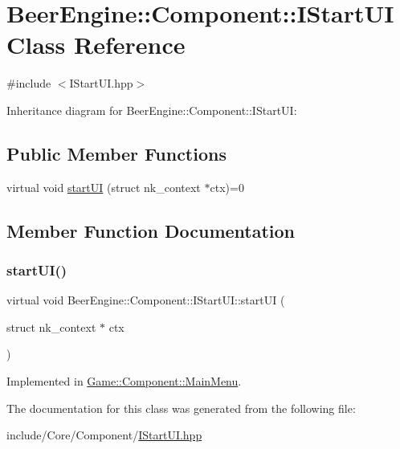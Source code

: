 \hypertarget{class_beer_engine_1_1_component_1_1_i_start_u_i}{}\section{Beer\+Engine\+:\+:Component\+:\+:I\+Start\+UI Class Reference}
\label{class_beer_engine_1_1_component_1_1_i_start_u_i}


{\ttfamily \#include $<$I\+Start\+U\+I.\+hpp$>$}



Inheritance diagram for Beer\+Engine\+:\+:Component\+:\+:I\+Start\+UI\+:
\subsection*{Public Member Functions}
\begin{DoxyCompactItemize}
\item 
virtual void \mbox{\hyperlink{class_beer_engine_1_1_component_1_1_i_start_u_i_a95b739f21079f5f103da42ea34f826f2}{start\+UI}} (struct nk\+\_\+context $\ast$ctx)=0
\end{DoxyCompactItemize}


\subsection{Member Function Documentation}
\mbox{\label{class_beer_engine_1_1_component_1_1_i_start_u_i_a95b739f21079f5f103da42ea34f826f2}} 
\subsubsection{\texorpdfstring{start\+U\+I()}{startUI()}}
{\footnotesize\ttfamily virtual void Beer\+Engine\+::\+Component\+::\+I\+Start\+U\+I\+::start\+UI (\begin{DoxyParamCaption}\item[{struct nk\+\_\+context $\ast$}]{ctx }\end{DoxyParamCaption})\hspace{0.3cm}{\ttfamily [pure virtual]}}



Implemented in \mbox{\hyperlink{class_game_1_1_component_1_1_main_menu_ae50614def462ca82eb6c4404ee82a82e}{Game\+::\+Component\+::\+Main\+Menu}}.



The documentation for this class was generated from the following file\+:\begin{DoxyCompactItemize}
\item 
include/\+Core/\+Component/\mbox{\hyperlink{_i_start_u_i_8hpp}{I\+Start\+U\+I.\+hpp}}\end{DoxyCompactItemize}
